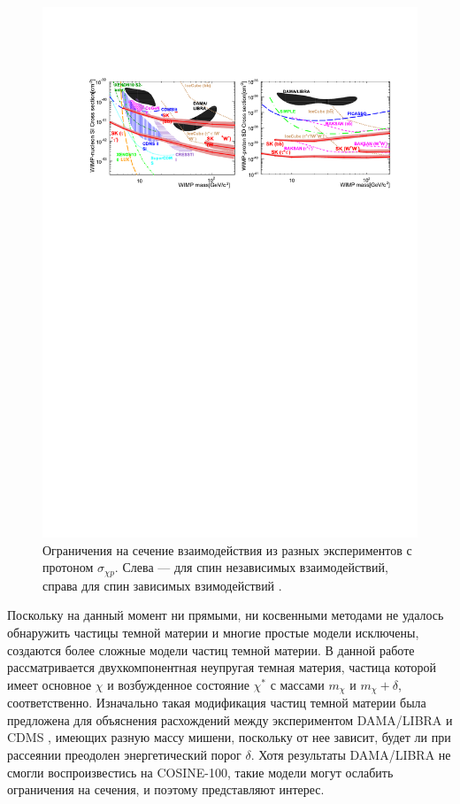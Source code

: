 \begin{figure}[!h]
	\begin{center}
		\includegraphics[scale=0.9]{images/SK_graphs.pdf}
	\end{center}
	\caption{Ограничения на сечение взаимодействия из разных экспериментов с протоном $\sigma_{\chi p}$. Слева --- для спин независимых взаимодействий, справа для спин зависимых взимодействий \cite{kamiokandecollaboration2015search}.}
	\label{graph:constr}
\end{figure}

Поскольку на данный момент ни прямыми, ни косвенными методами не удалось обнаружить частицы темной материи и многие простые модели исключены, создаются более сложные модели частиц темной материи.
В данной работе рассматривается двухкомпонентная неупругая темная материя, частица которой имеет основное $\chi$ и возбужденное состояние $\chi^*$ с массами $m_{\chi}$ и $m_{\chi}+\delta$, соответственно. Изначально такая модификация частиц темной материи была предложена для объяснения расхождений между экспериментом DAMA/LIBRA и CDMS \cite{PhysRevD.64.043502}, имеющих разную массу мишени, поскольку от нее зависит, будет ли при рассеянии преодолен энергетический порог $\delta$. Хотя результаты DAMA/LIBRA не смогли воспроизвестись на COSINE-100, такие модели могут ослабить ограничения на сечения, и поэтому представляют интерес.

